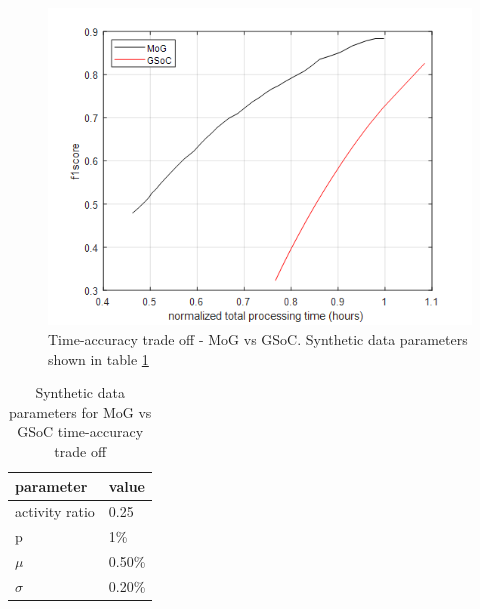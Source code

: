 \begin{figure}
    \centering
    \includegraphics[width=\linewidth]{images/time-acc-tradeoff-mog_vs_gsoc.png}
    \caption[Time-accuracy trade off - MoG vs GSoC]{Time-accuracy trade off - MoG vs GSoC. Synthetic data parameters shown in table \ref{table:fig1_data_params}}
    \label{fig:time-acc-tradeoff-mog_vs_gsoc}
\end{figure}

\begin{table}
\centering
\caption{Synthetic data parameters for MoG vs GSoC time-accuracy trade off} \vspace{5pt}
\label{table:fig1_data_params}
\begin{tabular}{|l|l|}
\hline
parameter             & value  \\ \hline \hline
activity ratio        & 0.25   \\
p                     & 1\%    \\ 
$\mu$    & 0.50\% \\ 
$\sigma$ & 0.20\% \\ \hline
\end{tabular}
\end{table}

